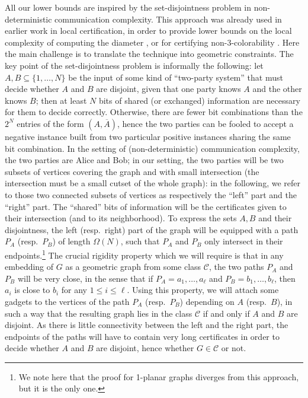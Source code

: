 \documentclass[a4paper,reqno, 12pt]{amsart}
\begin{document}
All our lower bounds are inspired by 
the set-disjointness problem in non-deterministic communication complexity. 
This approach was already used in earlier work in local certification, in
order to provide lower bounds on the local complexity of computing the
diameter \cite{CPP20}, or for certifying non-3-colorability \cite{lcp}. Here the main challenge is to translate the
technique into geometric constraints. 
The key point of the set-disjointness problem is informally the following:
 let $A,B\subseteq \{1,\ldots, N\}$ be the input of some kind of ``two-party system''
that must decide whether $A$ and $B$ are disjoint, given that one party knows
 $A$ and the other knows $B$; then at least $N$ bits of shared (or
exchanged) information are necessary for them to decide correctly. Otherwise,
there are fewer bit combinations than the $2^N$ entries of the form $(A, \overline{A})$, hence the two parties can be fooled to accept a negative
instance built from two particular positive instances sharing the same bit combination.
In the setting of (non-deterministic) communication complexity, the two parties are Alice and Bob; 
in our setting, the two parties will be two subsets of vertices
covering the graph and with small intersection (the intersection must be a small cutset of the whole graph): in the following, we refer to those two
connected subsets of vertices as respectively the ``left'' part and the ``right'' part. 
The ``shared'' bits of information will be the certificates given to their intersection (and to its neighborhood).
To express the sets $A,B$ and their disjointness, the left (resp.~right) part of the graph will be equipped with a path $P_A$ (resp.~$P_B$) of length $\Omega(N)$,
such that $P_A$ and $P_B$ only intersect in their
endpoints.\footnote{We note here that the proof for
  1-planar graphs diverges from this approach, but it is the only
  one.} The crucial rigidity property which we will require is that
in 
any embedding of $G$ as a geometric graph from some class
$\mathcal{C}$, the two paths $P_A$ and $P_B$ will be very close, in
the sense that if $P_A=a_1,\ldots,a_\ell$ and $P_B=b_1,\ldots,b_\ell$,
then $a_i$ is close to $b_i$ for any $1\le i \le \ell$. 
Using this property, we will attach some gadgets 
to the vertices of the path $P_A$ (resp.~$P_B$) depending on $A$ (resp.~$B$),
in such a way that the
resulting graph lies in the class $\mathcal{C}$ if and only if $A$ and $B$
are disjoint. As there is little connectivity 
between the left and the right part,
the endpoints of the paths will have to contain very long
certificates in order to decide whether $A$ and $B$ are disjoint,
hence whether $G\in  \mathcal{C}$ or not.
\end{document}
